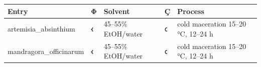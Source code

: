 \documentclass[12pt,a4paper]{article}
\begin{document}
\begin{longtable}[]{@{}lllll@{}}
\toprule
\begin{minipage}[b]{0.17\columnwidth}\raggedright
Entry\strut
\end{minipage} & \begin{minipage}[b]{0.17\columnwidth}\raggedright
Φ\strut
\end{minipage} & \begin{minipage}[b]{0.17\columnwidth}\raggedright
Solvent\strut
\end{minipage} & \begin{minipage}[b]{0.17\columnwidth}\raggedright
Ç\strut
\end{minipage} & \begin{minipage}[b]{0.17\columnwidth}\raggedright
Process\strut
\end{minipage}\tabularnewline
\midrule
\endhead
\begin{minipage}[t]{0.17\columnwidth}\raggedright
artemisia\_absinthium\strut
\end{minipage} & \begin{minipage}[t]{0.17\columnwidth}\raggedright
𐑬\strut
\end{minipage} & \begin{minipage}[t]{0.17\columnwidth}\raggedright
45--55\% EtOH/water\strut
\end{minipage} & \begin{minipage}[t]{0.17\columnwidth}\raggedright
𐑤\strut
\end{minipage} & \begin{minipage}[t]{0.17\columnwidth}\raggedright
cold maceration 15--20 °C, 12--24 h\strut
\end{minipage}\tabularnewline
\begin{minipage}[t]{0.17\columnwidth}\raggedright
mandragora\_officinarum\strut
\end{minipage} & \begin{minipage}[t]{0.17\columnwidth}\raggedright
𐑬\strut
\end{minipage} & \begin{minipage}[t]{0.17\columnwidth}\raggedright
45--55\% EtOH/water\strut
\end{minipage} & \begin{minipage}[t]{0.17\columnwidth}\raggedright
𐑤\strut
\end{minipage} & \begin{minipage}[t]{0.17\columnwidth}\raggedright
cold maceration 15--20 °C, 12--24 h\strut
\end{minipage}\tabularnewline

\end{longtable}
\end{document}
